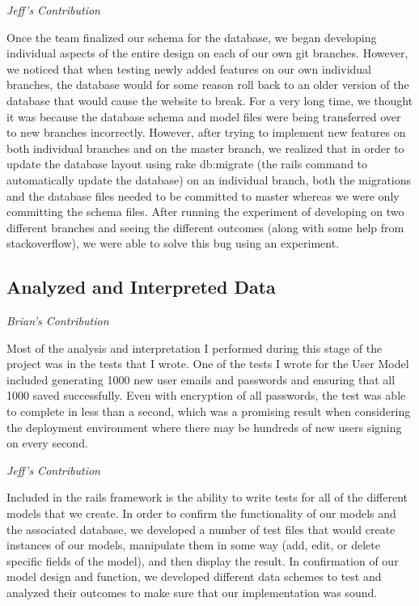 \documentclass[11pt]{article}
\begin{document}
\textit{Jeff's Contribution}

Once the team finalized our schema for the database, we began developing individual aspects of the entire design on each of our own git branches.  However, we noticed that when testing newly added features on our own individual branches, the database would for some reason roll back to an older version of the database that would cause the website to break.  For a very long time, we thought it was because the database schema and model files were being transferred over to new branches incorrectly.  However, after trying to implement new features on both individual branches and on the master branch, we realized that in order to update the database layout using rake db:migrate (the rails command to automatically update the database) on an individual branch, both the migrations and the database files needed to be committed to master whereas we were only committing the schema files.  After running the experiment of developing on two different branches and seeing the different outcomes (along with some help from stackoverflow), we were able to solve this bug using an experiment.

\subsection{Analyzed and Interpreted Data}

\textit{Brian's Contribution}

Most of the analysis and interpretation I performed during this stage of the project was in the tests that I wrote. One of the tests I wrote for the User Model included generating 1000 new user emails and passwords and ensuring that all 1000 saved successfully. Even with encryption of all passwords, the test was able to complete in less than a second, which was a promising result when considering the deployment environment where there may be hundreds of new users signing on every second. 

\textit{Jeff's Contribution}

Included in the rails framework is the ability to write tests for all of the different models that we create.  In order to confirm the functionality of our models and the associated database, we developed a number of test files that would create instances of our models, manipulate them in some way (add, edit, or delete specific fields of the model), and then display the result.  In confirmation of our model design and function, we developed different data schemes to test and analyzed their outcomes to make sure that our implementation was sound.
\end{document}
